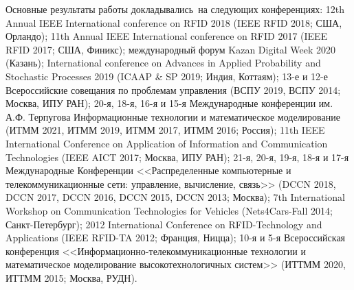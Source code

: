 {\probation}
Основные результаты работы докладывались~на следующих конференциях: 12th Annual IEEE International conference on RFID 2018 (IEEE RFID 2018; США, Орландо); 11th Annual IEEE International conference on RFID 2017 (IEEE RFID 2017; США, Финикс); международный форум Kazan Digital Week 2020 (Казань); International conference on Advances in Applied Probability and Stochastic Processes 2019 (ICAAP \& SP 2019; Индия, Коттаям); 13-е и 12-е Всероссийские совещания по проблемам управления (ВСПУ 2019, ВСПУ 2014; Москва, ИПУ РАН); 20-я, 18-я, 16-я и 15-я Международные конференции им. А.Ф. Терпугова Информационные технологии и математическое моделирование (ИТММ 2021, ИТММ 2019, ИТММ 2017, ИТММ 2016; Россия); 11th IEEE International Conference on Application of Information and Communication Technologies (IEEE AICT 2017; Москва, ИПУ РАН); 21-я, 20-я, 19-я, 18-я и 17-я Международные Конференции <<Распределенные компьютерные и телекоммуникационные сети: управление, вычисление, связь>> (DCCN 2018, DCCN 2017, DCCN 2016, DCCN 2015, DCCN 2013; Москва); 7th International Workshop on Communication Technologies for Vehicles (Nets4Cars-Fall 2014; Санкт-Петербург); 2012 International Conference on RFID-Technology and Applications (IEEE RFID-TA 2012; Франция, Ницца); 10-я и 5-я Всероссийская конференция <<Информационно-телекоммуникационные технологии и математическое моделирование высокотехнологичных систем>> (ИТТММ 2020, ИТТММ 2015; Москва, РУДН).



